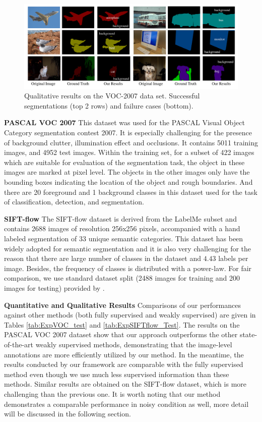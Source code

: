 \begin{figure}
\begin{center}
    \includegraphics[width=0.9\linewidth]{Fig_VOC.pdf}
\end{center}
\vspace{-5mm}
\caption{Qualitative results on the VOC-2007 data set. Successful segmentations (top 2 rows) and failure cases (bottom).}
\label{fig:VOC-2007}
\end{figure}

\textbf{PASCAL VOC 2007}
This dataset was used for the PASCAL Visual Object Category segmentation contest 2007. It is especially challenging for the presence of background clutter, illumination effect and occlusions. It contains 5011 training images, and 4952 test images. Within the training set, for a subset of 422 images which are suitable for evaluation of the segmentation task, the object in these images are marked at pixel level. The objects in the other images only have the bounding boxes indicating the location of the object and rough boundaries. And there are 20 foreground and 1 background classes in this dataset used for the task of classification, detection, and segmentation.

\textbf{SIFT-flow} The SIFT-flow dataset\cite{liu2011nonparametric} is derived from the LabelMe subset and contains 2688 images of resolution 256x256 pixels, accompanied with a hand labeled segmentation of 33 unique semantic categories. This dataset has been widely adopted for semantic segmentation and it is also very challenging for the reason that there are large number of classes in the dataset and $4.43$ labels per image. Besides, the frequency of classes is distributed with a power-law. For fair comparison, we use standard dataset split (2488 images for training and 200 images for testing) provided by \cite{liu2011nonparametric}.

\textbf{Quantitative and Qualitative Results} Comparisons of our performances against other methods (both fully supervised and weakly supervised) are given in Tables \ref{tab:ExpVOC_test} and \ref{tab:ExpSIFTflow_Test}. The results on the PASCAL VOC 2007 dataset show that our approach outperforms the other state-of-the-art weakly supervised methods, demonstrating that the image-level annotations are more efficiently utilized by our method. In the meantime, the results conducted by our framework are comparable with the fully supervised method even though we use much less supervised information than these methods. Similar results are obtained on the SIFT-flow dataset, which is more challenging than the previous one. It is worth noting that our method demonstrates a comparable performance in noisy condition as well, more detail will be discussed in the following section.

